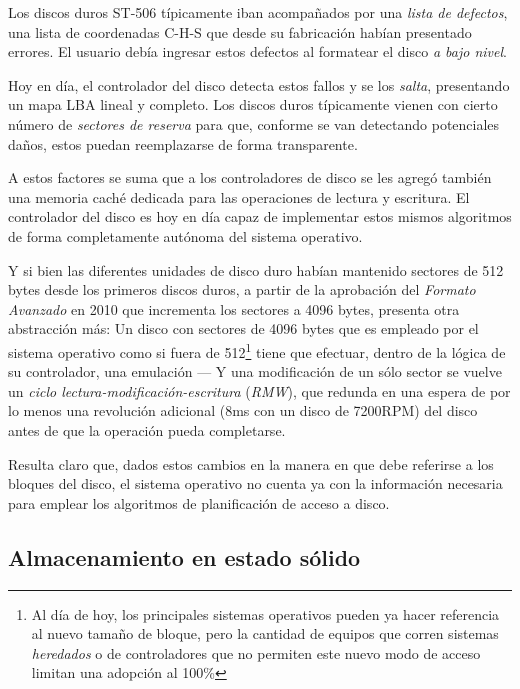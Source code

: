 \documentclass[11pt,fleqn]{book} %
\begin{document}
\begin{description}
     Los discos duros ST-506 típicamente iban acompañados por una
     \emph{lista de defectos}, una lista de coordenadas C-H-S que desde su
     fabricación habían presentado errores. El usuario debía ingresar
     estos defectos al formatear el disco \emph{a bajo nivel}.

     Hoy en día, el controlador del disco detecta estos fallos y se
     los \emph{salta}, presentando un mapa LBA lineal y completo. Los
     discos duros típicamente vienen con cierto número de \emph{sectores de      reserva} para que, conforme se van detectando potenciales daños,
     estos puedan reemplazarse de forma transparente.
\end{description}

A estos factores se suma que a los controladores de disco se les
agregó también una memoria caché dedicada
para las operaciones de lectura y escritura. El controlador del disco
es hoy en día capaz de implementar estos mismos algoritmos de forma
completamente autónoma del sistema operativo.

Y si bien las diferentes unidades de disco duro habían mantenido
sectores de 512 bytes desde los primeros discos duros, a partir de la
aprobación del \emph{Formato Avanzado} en 2010 que incrementa los sectores
a 4096 bytes, presenta otra abstracción más: Un disco con sectores de
4096 bytes que es empleado por el sistema operativo como si fuera de
512\footnote{Al día de hoy, los principales sistemas operativos pueden ya
hacer referencia al nuevo tamaño de bloque, pero la cantidad de
equipos que corren sistemas \emph{heredados} o de controladores que no
permiten este nuevo modo de acceso limitan una adopción al 100\% } tiene
que efectuar, dentro de la lógica de su controlador, una emulación — Y
una modificación de un sólo sector se vuelve un \emph{ciclo lectura-modificación-escritura} (\emph{RMW}), que redunda en una espera de
por lo menos una revolución adicional (8ms con un disco de 7200RPM)
del disco antes de que la operación pueda completarse.

Resulta claro que, dados estos cambios en la manera en que debe
referirse a los bloques del disco, el sistema operativo no cuenta ya
con la información necesaria para emplear los algoritmos de
planificación de acceso a disco.
\subsection{Almacenamiento en estado sólido}
\label{sec-10-1-2}
\label{FS_FIS_estado_solido}
\end{document}
